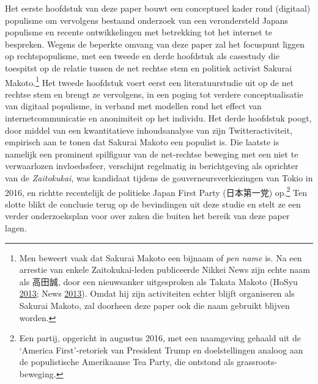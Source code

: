 \documentclass[10.5pt,dutch,]{article}
\begin{document}
Het eerste hoofdstuk van deze paper bouwt een conceptueel kader rond
(digitaal) populisme om vervolgens bestaand onderzoek van een
verondersteld Japans populisme en recente ontwikkelingen met betrekking
tot het internet te bespreken. Wegens de beperkte omvang van deze paper
zal het focuspunt liggen op rechtspopulisme, met een tweede en derde
hoofdstuk als casestudy die toespitst op de relatie tussen de net
rechtse stem en politiek activist Sakurai Makoto.\footnote{Men beweert
  vaak dat Sakurai Makoto een bijnaam of \emph{pen name} is. Na een
  arrestie van enkele Zaitokukai-leden publiceerde Nikkei News zijn
  echte naam als 高田誠, door een nieuwsanker uitgesproken als Takata
  Makoto (HoSyu
  \protect\hyperlink{ref-hosyuux5fzaitokukaiux5f2013}{2013}; News
  \protect\hyperlink{ref-nikkeiux5fnewsux5fdemo-meguriux5f2013}{2013}).
  Omdat hij zijn activiteiten echter blijft organiseren als Sakurai
  Makoto, zal doorheen deze paper ook die naam gebruikt blijven worden.}
Het tweede hoofdstuk voert eerst een literatuurstudie uit op de net
rechtse stem en brengt ze vervolgens, in een poging tot verdere
conceptualisatie van digitaal populisme, in verband met modellen rond
het effect van internetcommunicatie en anonimiteit op het individu. Het
derde hoofdstuk poogt, door middel van een kwantitatieve inhoudsanalyse
van zijn Twitteractiviteit, empirisch aan te tonen dat Sakurai Makoto
een populist is. Die laatste is namelijk een prominent spilfiguur van de
net-rechtse beweging met een niet te verwaarlozen invloedssfeer,
verschijnt regelmatig in berichtgeving als oprichter van de
\emph{Zaitokukai}, was kandidaat tijdens de gouverneursverkiezingen van
Tokio in 2016, en richtte recentelijk de politieke Japan First Party
(日本第一党) op.\footnote{Een partij, opgericht in augustus 2016, met
  een naamgeving gehaald uit de `America First'-retoriek van President
  Trump en doelstellingen analoog aan de populistische Amerikaanse Tea
  Party, die ontstond als grassroots-beweging.} Ten slotte blikt de
conclusie terug op de bevindingen uit deze studie en stelt ze een verder
onderzoeksplan voor over zaken die buiten het bereik van deze paper
lagen.
\end{document}
